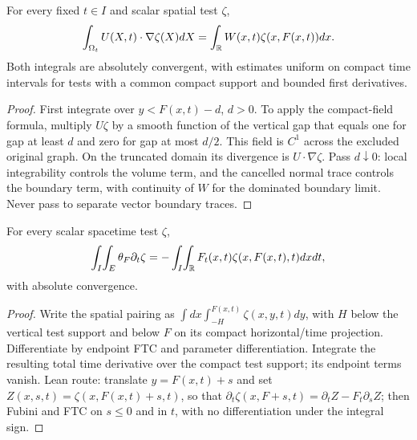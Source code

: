 \begin{lemma}
  \label{lem:c13_spatial_flux}
  For every fixed $t\in I$ and scalar spatial test $\zeta$,
  \[
    \int_{\Omega_t}U(X,t)\cdot\nabla\zeta(X)dX
      =\int_{\mathbb{R}} W(x,t)\zeta(x,F(x,t))dx.
  \]
  Both integrals are absolutely convergent, with estimates uniform on compact time intervals
  for tests with a common compact support and bounded first derivatives.
\end{lemma}
\begin{proof}
  First integrate over $y<F(x,t)-d$, $d>0$. To apply the compact-field formula, multiply
  $U\zeta$ by a smooth function of the vertical gap that equals one for gap at least $d$
  and zero for gap at most $d/2$. This field is $C^1$ across the excluded original graph.
  On the truncated domain its divergence is $U\cdot\nabla\zeta$.
  Pass $d\downarrow0$: local integrability controls the volume term, and the cancelled normal
  trace controls the boundary term, with continuity of $W$ for the dominated boundary limit.
  Never pass to separate vector boundary traces.
\end{proof}

\begin{lemma}
  \label{lem:c13_moving_patch_pairing}
  For every scalar spacetime test $\zeta$,
  \[
    \int_I\!\int_E\theta_F\partial_t\zeta
       =-\int_I\!\int_{\mathbb{R}} F_t(x,t)\zeta(x,F(x,t),t)dxdt,
  \]
  with absolute convergence.
\end{lemma}
\begin{proof}
  Write the spatial pairing as $\int dx\int_{-H}^{F(x,t)}\zeta(x,y,t)dy$, with $H$ below
  the vertical test support and below $F$ on its compact horizontal/time projection.
  Differentiate by endpoint FTC and parameter differentiation. Integrate the resulting total
  time derivative over the compact test support; its endpoint terms vanish.
  Lean route: translate $y=F(x,t)+s$ and set $Z(x,s,t)=\zeta(x,F(x,t)+s,t)$, so that
  $\partial_t\zeta(x,F+s,t)=\partial_tZ-F_t\partial_sZ$; then Fubini and FTC on $s\le0$ and in $t$,
  with no differentiation under the integral sign.
\end{proof}

